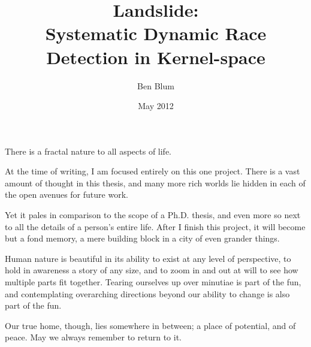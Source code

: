 \pagestyle{empty}

\title{\bf Landslide: \\
  Systematic Dynamic Race Detection in Kernel-space}
\author{Ben Blum}
\date{May 2012}






\maketitle

\begin{dedication}
There is a fractal nature to all aspects of life.

At the time of writing, I am focused entirely on this one project. There is a vast amount of thought in this thesis, and many more rich worlds lie hidden in each of the open avenues for future work.

Yet it pales in comparison to the scope of a Ph.D. thesis, and even more so next to all the details of a person's entire life.
After I finish this project, it will become but a fond memory, a mere building block in a city of even grander things.

Human nature is beautiful in its ability to exist at any level of perspective, to hold in awareness a story of any size, and to zoom in and out at will to see how multiple parts fit together.
Tearing ourselves up over minutiae is part of the fun, and contemplating overarching directions beyond our ability to change is also part of the fun.

Our true home, though, lies somewhere in between; a place of potential, and of peace. May we always remember to return to it.
\end{dedication}

\pagestyle{plain} %
